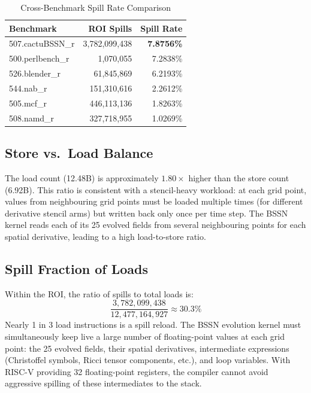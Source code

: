 \documentclass[conference]{IEEEtran}
\begin{document}
\begin{table}[H]
\centering
\caption{Cross-Benchmark Spill Rate Comparison}
\label{tab:compare}
\begin{tabular}{lrr}
\toprule
\textbf{Benchmark} & \textbf{ROI Spills} & \textbf{Spill Rate} \\
\midrule
507.cactuBSSN\_r & 3,782,099,438 & \textbf{7.8756\%} \\
500.perlbench\_r &     1,070,055 & 7.2838\% \\
526.blender\_r   &    61,845,869 & 6.2193\% \\
544.nab\_r       &   151,310,616 & 2.2612\% \\
505.mcf\_r       &   446,113,136 & 1.8263\% \\
508.namd\_r      &   327,718,955 & 1.0269\% \\
\bottomrule
\end{tabular}
\end{table}

\subsection{Store vs.\ Load Balance}

The load count (12.48B) is approximately $1.80\times$ higher than the
store count (6.92B). This ratio is consistent with a stencil-heavy
workload: at each grid point, values from neighbouring grid points
must be loaded multiple times (for different derivative stencil arms)
but written back only once per time step. The BSSN kernel reads each
of its 25 evolved fields from several neighbouring points for each
spatial derivative, leading to a high load-to-store ratio.

\subsection{Spill Fraction of Loads}

Within the ROI, the ratio of spills to total loads is:
\[
\frac{3{,}782{,}099{,}438}{12{,}477{,}164{,}927} \approx 30.3\%
\]
Nearly 1 in 3 load instructions is a spill reload. The BSSN evolution
kernel must simultaneously keep live a large number of floating-point
values at each grid point: the 25 evolved fields, their spatial
derivatives, intermediate expressions (Christoffel symbols, Ricci
tensor components, etc.), and loop variables. With RISC-V providing
32 floating-point registers, the compiler cannot avoid aggressive
spilling of these intermediates to the stack.
\end{document}
